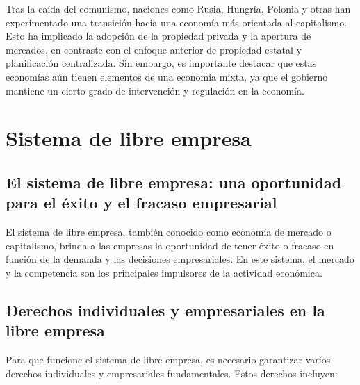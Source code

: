 \documentclass[
  man,
  floatsintext,
  longtable,
  a4paper,
  nolmodern,
  notxfonts,
  notimes,
  colorlinks=true,linkcolor=blue,citecolor=blue,urlcolor=blue]{apa7}
\begin{document}
Tras la caída del comunismo, naciones como Rusia, Hungría, Polonia y
otras han experimentado una transición hacia una economía más orientada
al capitalismo. Esto ha implicado la adopción de la propiedad privada y
la apertura de mercados, en contraste con el enfoque anterior de
propiedad estatal y planificación centralizada. Sin embargo, es
importante destacar que estas economías aún tienen elementos de una
economía mixta, ya que el gobierno mantiene un cierto grado de
intervención y regulación en la economía.

\section{Sistema de libre empresa}\label{sistema-de-libre-empresa}

\subsection{El sistema de libre empresa: una oportunidad para el éxito y
el fracaso
empresarial}\label{el-sistema-de-libre-empresa-una-oportunidad-para-el-uxe9xito-y-el-fracaso-empresarial}

El sistema de libre empresa, también conocido como economía de mercado o
capitalismo, brinda a las empresas la oportunidad de tener éxito o
fracaso en función de la demanda y las decisiones empresariales. En este
sistema, el mercado y la competencia son los principales impulsores de
la actividad económica.

\subsection{Derechos individuales y empresariales en la libre
empresa}\label{derechos-individuales-y-empresariales-en-la-libre-empresa}

Para que funcione el sistema de libre empresa, es necesario garantizar
varios derechos individuales y empresariales fundamentales. Estos
derechos incluyen:
\end{document}
